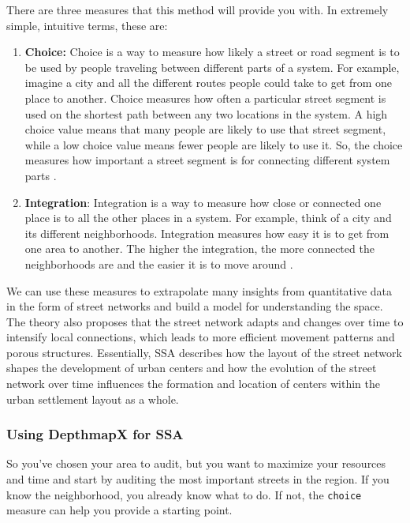 \documentclass[
]{latex/krantz}
\begin{document}
There are three measures that this method will provide you with. In extremely simple, intuitive terms, these are:

\begin{enumerate}
\def\labelenumi{\arabic{enumi}.}
\item
  \textbf{Choice:} Choice is a way to measure how likely a street or road segment is to be used by people traveling between different parts of a system. For example, imagine a city and all the different routes people could take to get from one place to another. Choice measures how often a particular street segment is used on the shortest path between any two locations in the system. A high choice value means that many people are likely to use that street segment, while a low choice value means fewer people are likely to use it. So, the choice measures how important a street segment is for connecting different system parts \autocite{hillierSocialLogicSpace1984}.
\item
  \textbf{Integration}: Integration is a way to measure how close or connected one place is to all the other places in a system. For example, think of a city and its different neighborhoods. Integration measures how easy it is to get from one area to another. The higher the integration, the more connected the neighborhoods are and the easier it is to move around \autocite{hillierSocialLogicSpace1984}.
\end{enumerate}

We can use these measures to extrapolate many insights from quantitative data in the form of street networks and build a model for understanding the space. The theory also proposes that the street network adapts and changes over time to intensify local connections, which leads to more efficient movement patterns and porous structures. Essentially, SSA describes how the layout of the street network shapes the development of urban centers and how the evolution of the street network over time influences the formation and location of centers within the urban settlement layout as a whole.

\hypertarget{using-depthmapx}{%
\subsubsection{Using DepthmapX for SSA}\label{using-depthmapx}}

So you've chosen your area to audit, but you want to maximize your resources and time and start by auditing the most important streets in the region. If you know the neighborhood, you already know what to do. If not, the \texttt{choice} measure can help you provide a starting point.
\end{document}

